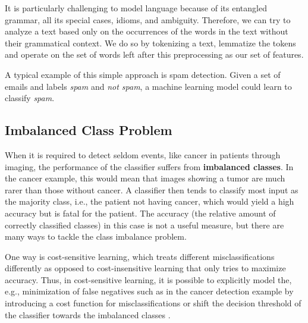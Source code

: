   It is particularly challenging to model language because of its entangled grammar, all its special cases, idioms, and ambiguity.
  Therefore, we can try to analyze a text based only on the occurrences of the words in the text without their grammatical context.
  We do so by tokenizing a text, lemmatize the tokens and operate on the set of words left after this preprocessing as our set of features.

  A typical example of this simple approach is spam detection.
  Given a set of emails and labels \textsl{spam} and \textsl{not spam}, a machine learning model could learn to classify \textsl{spam}.

\subsection{Imbalanced Class Problem}
  When it is required to detect seldom events, like cancer in patients through imaging, the performance of the classifier suffers from \textbf{imbalanced classes}.
  In the cancer example, this would mean that images showing a tumor are much rarer than those without cancer.
  A classifier then tends to classify most input as the majority class, i.e., the patient not having cancer, which would yield a high accuracy but is fatal for the patient.
  The accuracy (the relative amount of correctly classified classes) in this case is not a useful measure, but there are many ways to tackle the class imbalance problem.

  One way is cost-sensitive learning, which treats different misclassifications differently as opposed to cost-insensitive learning that only tries to maximize accuracy.
  Thus, in cost-sensitive learning, it is possible to explicitly model the, e.g., minimization of false negatives such as in the cancer detection example by introducing a cost function for misclassifications or shift the decision threshold of the classifier towards the imbalanced classes \citep{Ling2008}.

